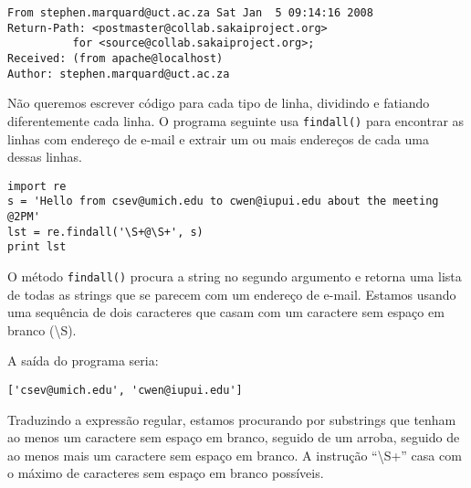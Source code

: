 \beforeverb
\begin{verbatim}
From stephen.marquard@uct.ac.za Sat Jan  5 09:14:16 2008
Return-Path: <postmaster@collab.sakaiproject.org>
          for <source@collab.sakaiproject.org>;
Received: (from apache@localhost)
Author: stephen.marquard@uct.ac.za
\end{verbatim}
\afterverb
%

Não queremos escrever código para cada tipo de linha, dividindo e fatiando diferentemente cada linha.
O programa seguinte usa {\tt findall()} para encontrar as linhas com endereço de e-mail e extrair um 
ou mais endereços de cada uma dessas linhas.

\beforeverb
\begin{verbatim}
import re
s = 'Hello from csev@umich.edu to cwen@iupui.edu about the meeting @2PM'
lst = re.findall('\S+@\S+', s)
print lst
\end{verbatim}
\afterverb
%

O método {\tt findall()} procura a string no segundo argumento e retorna uma lista de todas
as strings que se parecem com um endereço de e-mail. Estamos usando uma sequência de dois 
caracteres que casam com um caractere sem espaço em branco ({\textbackslash}S).

A saída do programa seria:

\beforeverb
\begin{verbatim}
['csev@umich.edu', 'cwen@iupui.edu']
\end{verbatim}
\afterverb
%

Traduzindo a expressão regular, estamos procurando por substrings que tenham ao menos um caractere 
sem espaço em branco, seguido de um arroba, seguido de ao menos mais um caractere sem espaço em 
branco. A instrução ``{\textbackslash}S+'' casa com o máximo de caracteres sem espaço em branco 
possíveis. 

